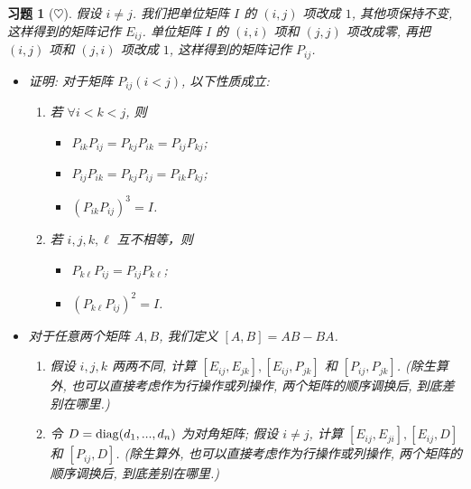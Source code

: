 \documentclass[UTF8]{ctexart}
\newtheorem{ex}[thm]{习题}
\begin{document}
 \begin{ex}[$\heartsuit $]
假设 $i\neq j$. 我们把单位矩阵 $I$ 的 $(i,j)$ 项改成 $1$, 其他项保持不变, 这样得到的矩阵记作 $E_{ij}$. 单位矩阵 $I$ 的 $(i,i)$ 项和 $(j,j)$ 项改成零, 再把 $(i,j)$ 项和 $(j,i)$ 项改成 $1$, 这样得到的矩阵记作 $P_{ij}$.
\begin{itemize}	
	\item[(a)] 证明: 对于矩阵 $P_{ij} (i<j)$, 以下性质成立:
	\begin{enumerate}
		\item 若 $\forall i<k<j$, 则
		\begin{itemize}
			\item $P_{ik}P_{ij}=P_{kj}P_{ik}=P_{ij}P_{kj}$;
			\item $P_{ij}P_{ik}=P_{kj}P_{ij}=P_{ik}P_{kj}$;
			\item $(P_{ik}P_{ij})^3=I$.
		\end{itemize}
		\item 若 $i,j,k,\ell$ 互不相等，则
		\begin{itemize}
			\item $P_{k\ell}P_{ij}=P_{ij}P_{k\ell}$;
			\item$(P_{k\ell}P_{ij})^2=I$.
		\end{itemize}
	\end{enumerate}
	
	\item[(b)] 对于任意两个矩阵 $A,B$, 我们定义 $[A,B]=AB-BA$.
	\begin{enumerate}
		\item 假设 $i,j,k$ 两两不同, 计算 $[E_{ij},E_{jk}], [E_{ij},P_{jk}]$ 和 $[P_{ij},P_{jk}]$. (除生算外, 也可以直接考虑作为行操作或列操作, 两个矩阵的顺序调换后, 到底差别在哪里.)
		\item 令 $D={\rm diag}(d_1,...,d_n)$ 为对角矩阵; 假设 $i\neq j$, 计算 $[E_{ij},E_{ji}], [E_{ij},D]$ 和 $[P_{ij},D]$. (除生算外, 也可以直接考虑作为行操作或列操作, 两个矩阵的顺序调换后, 到底差别在哪里.)
	\end{enumerate}
	\end{itemize}
\end{ex}
\end{document}
